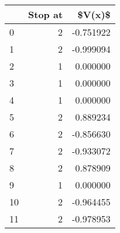 \begin{tabular}{lrr}
\toprule
{} &  Stop at &    \$V(x)\$ \\
\midrule
0  &        2 & -0.751922 \\
1  &        2 & -0.999094 \\
2  &        1 &  0.000000 \\
3  &        1 &  0.000000 \\
4  &        1 &  0.000000 \\
5  &        2 &  0.889234 \\
6  &        2 & -0.856630 \\
7  &        2 & -0.933072 \\
8  &        2 &  0.878909 \\
9  &        1 &  0.000000 \\
10 &        2 & -0.964455 \\
11 &        2 & -0.978953 \\
\bottomrule
\end{tabular}

